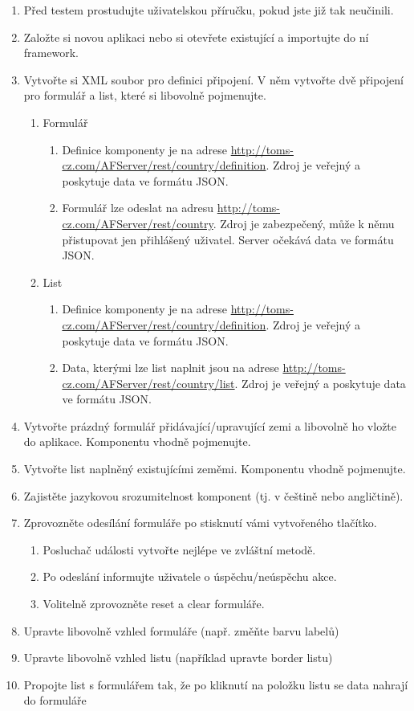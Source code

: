 \begin{enumerate}
\item Před testem prostudujte uživatelskou příručku, pokud jste již tak neučinili.
\item Založte si novou aplikaci nebo si otevřete existující a importujte do ní framework.
\item Vytvořte si XML soubor pro definici připojení. V něm vytvořte dvě připojení pro formulář a list, které si libovolně pojmenujte. 
\begin{enumerate}
\item Formulář
\begin{enumerate}
\item Definice komponenty je na adrese \url{http://toms-cz.com/AFServer/rest/country/definition}. Zdroj je veřejný a poskytuje data ve formátu JSON.
\item Formulář lze odeslat na adresu \url{http://toms-cz.com/AFServer/rest/country}. Zdroj je zabezpečený, může k němu přistupovat jen přihlášený uživatel. Server očekává data ve formátu JSON.
\end{enumerate}
\item List
\begin{enumerate}
\item Definice komponenty je na adrese \url{http://toms-cz.com/AFServer/rest/country/definition}. Zdroj je veřejný a poskytuje data ve formátu JSON.
\item Data, kterými lze list naplnit jsou na adrese \url{http://toms-cz.com/AFServer/rest/country/list}.  Zdroj je veřejný a poskytuje data ve formátu JSON.
\end{enumerate}
\end{enumerate}
\item Vytvořte prázdný formulář přidávající/upravující zemi a libovolně ho vložte do aplikace. Komponentu vhodně pojmenujte.
\item Vytvořte list naplněný existujícími zeměmi. Komponentu vhodně pojmenujte.
\item Zajistěte jazykovou srozumitelnost komponent (tj. v češtině nebo angličtině).
\item Zprovozněte odesílání formuláře po stisknutí vámi vytvořeného tlačítko.
\begin{enumerate}
\item Posluchač události vytvořte nejlépe ve zvláštní metodě.
\item Po odeslání informujte uživatele o úspěchu/neúspěchu akce.
\item Volitelně zprovozněte reset a clear formuláře.
\end{enumerate}
\item Upravte libovolně vzhled formuláře (např. změňte barvu labelů)
\item Upravte libovolně vzhled listu (například upravte border listu)
\item Propojte list s formulářem tak, že po kliknutí na položku listu se data nahrají do formuláře
\end{enumerate}

